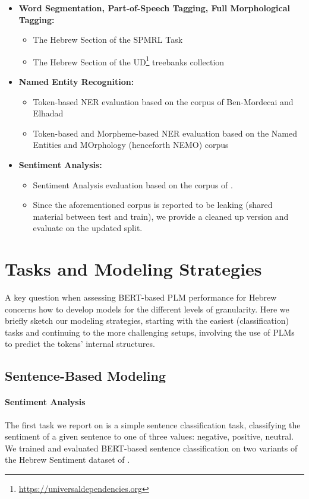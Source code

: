 \documentclass[11pt,a4paper]{article}
\begin{document}
\begin{itemize}
    \item {\bf Word Segmentation, Part-of-Speech Tagging, Full Morphological Tagging:}
    \begin{itemize}
        \item The Hebrew Section of the SPMRL Task \cite{spmrl}
        \item The Hebrew Section of the UD\footnote{\url{https://universaldependencies.org}} treebanks collection \cite{hebUD}
    \end{itemize}
    \item {\bf Named Entity Recognition:}
    \begin{itemize}
        \item Token-based NER evaluation based on the corpus of Ben-Mordecai and Elhadad \cite{bmcner}
        \item Token-based and Morpheme-based NER evaluation based on the Named Entities and MOrphology (henceforth NEMO) corpus  \cite{nemo}
    \end{itemize}
    \item {\bf Sentiment Analysis:}
   \begin{itemize}
       \item 
    Sentiment Analysis  evaluation based on the corpus of  \citet{amram2018}.
    \item Since the aforementioned corpus is reported to be leaking (shared material between test and train), we provide a cleaned up version and evaluate on the updated split.
    \end{itemize}
\end{itemize}


\section{Tasks and Modeling Strategies}
A key question when assessing BERT-based PLM performance for Hebrew  concerns how to develop models for the different levels of granularity. Here we briefly sketch our modeling strategies, starting with the easiest (classification) tasks and continuing to the more challenging setups, involving the use of PLMs to predict  the tokens' internal  structures.
\subsection{Sentence-Based Modeling}

\paragraph{Sentiment Analysis}
The first task we report on is a simple sentence classification task, classifying the sentiment of a given sentence to one of three values: negative, positive, neutral.
We trained and evaluated  BERT-based sentence classification on two variants of the Hebrew Sentiment dataset of \citet{amram2018}. 
\end{document}

